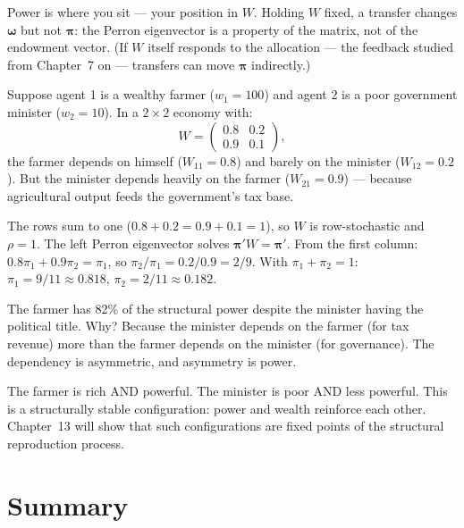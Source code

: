 \documentclass[../structural_economics_book.tex]{subfiles}
\begin{document}
Power is where you sit --- your position in $W$. Holding $W$ fixed, a transfer changes $\boldsymbol{\omega}$ but not $\boldsymbol{\pi}$: the Perron eigenvector is a property of the matrix, not of the endowment vector. (If $W$ itself responds to the allocation --- the feedback studied from Chapter~7 on --- transfers can move $\boldsymbol{\pi}$ indirectly.)

\begin{example}\label{ch06:ex:rich_poor}
Suppose agent 1 is a wealthy farmer ($w_1 = 100$) and agent 2 is a poor government minister ($w_2 = 10$). In a $2 \times 2$ economy with:
\begin{equation}
W = \begin{pmatrix} 0.8 & 0.2 \\ 0.9 & 0.1 \end{pmatrix},
\end{equation}
the farmer depends on himself ($W_{11} = 0.8$) and barely on the minister ($W_{12} = 0.2$). But the minister depends heavily on the farmer ($W_{21} = 0.9$) --- because agricultural output feeds the government's tax base.

The rows sum to one ($0.8 + 0.2 = 0.9 + 0.1 = 1$), so $W$ is row-stochastic and $\rho = 1$. The left Perron eigenvector solves $\boldsymbol{\pi}' W = \boldsymbol{\pi}'$. From the first column: $0.8\pi_1 + 0.9\pi_2 = \pi_1$, so $\pi_2/\pi_1 = 0.2/0.9 = 2/9$. With $\pi_1 + \pi_2 = 1$: $\pi_1 = 9/11 \approx 0.818$, $\pi_2 = 2/11 \approx 0.182$.

The farmer has 82\% of the structural power despite the minister having the political title. Why? Because the minister depends on the farmer (for tax revenue) more than the farmer depends on the minister (for governance). The dependency is asymmetric, and asymmetry is power.

The farmer is rich AND powerful. The minister is poor AND less powerful. This is a structurally stable configuration: power and wealth reinforce each other. Chapter~13 will show that such configurations are fixed points of the structural reproduction process.
\end{example}


\section{Summary}
\label{ch06:sec:summary}
\end{document}
